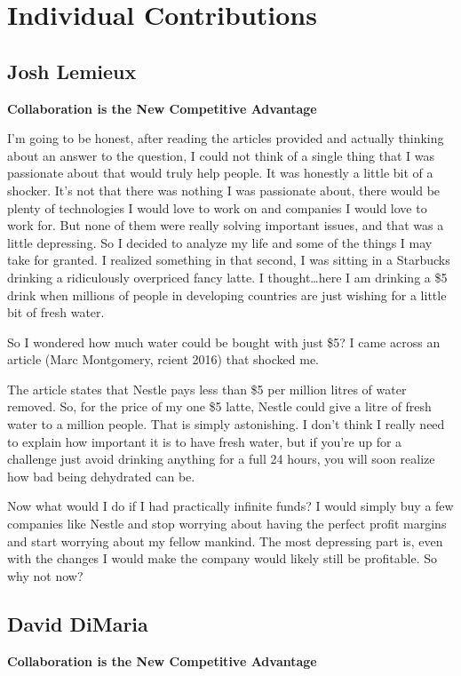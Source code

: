 \documentclass[12pt,letterpaper]{article}
\begin{document}
\clearpage
\section{Individual Contributions}
\subsection{Josh Lemieux}
\textbf{Collaboration is the New Competitive Advantage}\par
I'm going to be honest, after reading the articles provided and actually thinking about an answer to the question, I could not think of a single thing that I was passionate about that would truly help people. It was honestly a little bit of a shocker. It's not that there was nothing I was passionate about, there would be plenty of technologies I would love to work on and companies I would love to work for. But none of them were really solving important issues, and that was a little depressing. So I decided to analyze my life and some of the things I may take for granted. I realized something in that second, I was sitting in a Starbucks drinking a ridiculously overpriced fancy latte. I thought\ldots here I am drinking a \$5 drink when millions of people in developing countries are just wishing for a little bit of fresh water.\par
So I wondered how much water could be bought with just \$5? I came across an article (Marc Montgomery, rcient 2016) that shocked me.\par
The article states that Nestle pays less than \$5 per million litres of water removed. So, for the price of my one \$5 latte, Nestle could give a litre of fresh water to a million people. That is simply astonishing. I don't think I really need to explain how important it is to have fresh water, but if you're up for a challenge just avoid drinking anything for a full 24 hours, you will soon realize how bad being dehydrated can be.\par
Now what would I do if I had practically infinite funds? I would simply buy a few companies like Nestle and stop worrying about having the perfect profit margins and start worrying about my fellow mankind. The most depressing part is, even with the changes I would make the company would likely still be profitable. So why not now?



\clearpage
\subsection{David DiMaria}
\textbf{Collaboration is the New Competitive Advantage}
\end{document}
